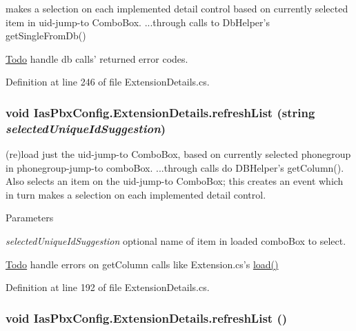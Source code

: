 makes a selection on each implemented detail control based on currently selected item in uid-\/jump-\/to ComboBox. ...through calls to DbHelper's getSingleFromDb() \begin{Desc}
\item[\hyperlink{todo__todo000029}{Todo}]handle db calls' returned error codes. \end{Desc}


Definition at line 246 of file ExtensionDetails.cs.\hypertarget{class_ias_pbx_config_1_1_extension_details_a64785a524e6fc2f62c0cd79e76a86709}{
\subsubsection[{refreshList}]{\setlength{\rightskip}{0pt plus 5cm}void IasPbxConfig.ExtensionDetails.refreshList (string {\em selectedUniqueIdSuggestion})}}
\label{class_ias_pbx_config_1_1_extension_details_a64785a524e6fc2f62c0cd79e76a86709}


(re)load just the uid-\/jump-\/to ComboBox, based on currently selected phonegroup in phonegroup-\/jump-\/to comboBox. ...through calls do DBHelper's getColumn(). Also selects an item on the uid-\/jump-\/to ComboBox; this creates an event which in turn makes a selection on each implemented detail control.


\begin{DoxyParams}{Parameters}
\item[{\em selectedUniqueIdSuggestion}]optional name of item in loaded comboBox to select. \end{DoxyParams}
\begin{Desc}
\item[\hyperlink{todo__todo000028}{Todo}]handle errors on getColumn calls like Extension.cs's \hyperlink{class_ias_pbx_config_1_1_extension_details_a9945d9c89ebedaed6d13fadc5bb5ad40}{load()} \end{Desc}


Definition at line 192 of file ExtensionDetails.cs.\hypertarget{class_ias_pbx_config_1_1_extension_details_a7a72ecc10cc4cf7cbb3c4f9c9b2098d7}{
\subsubsection[{refreshList}]{\setlength{\rightskip}{0pt plus 5cm}void IasPbxConfig.ExtensionDetails.refreshList ()}}
\label{class_ias_pbx_config_1_1_extension_details_a7a72ecc10cc4cf7cbb3c4f9c9b2098d7}


